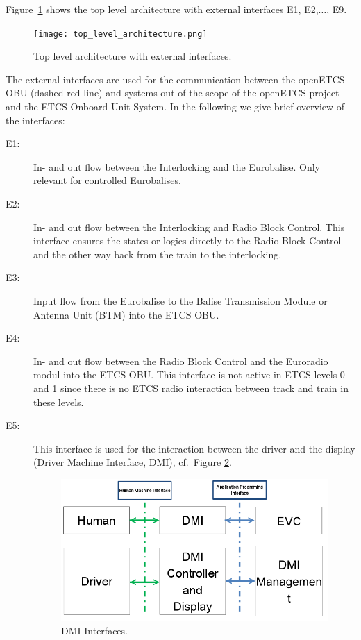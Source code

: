 Figure~\ref{f:top_level} shows the top level architecture with external interfaces E1, E2,$\ldots$, E9.
\begin{figure}
\centering
\texttt{[image: top\_level\_architecture.png]}
\caption{Top level architecture with external interfaces.}
\label{f:top_level}
\end{figure}
The external interfaces are used for the communication between the openETCS OBU (dashed red line) and systems out of the scope of the openETCS project and the ETCS Onboard Unit System. In the following we give  brief overview of the interfaces:
\begin{description}
\item[E1:] In- and out flow between the Interlocking and the Eurobalise. Only relevant for controlled Eurobalises.

\item[E2:] In- and out flow between the Interlocking and Radio Block Control.
This interface ensures the states or logics directly to the Radio Block Control and the other way back from the train to the interlocking.

\item[E3:] Input flow from the Eurobalise to the Balise Transmission Module or Antenna Unit (BTM) into the ETCS OBU.

\item[E4:] In- and out flow between the Radio Block Control and the Euroradio modul into the ETCS OBU. This interface is not active in ETCS levels 0 and 1 since there is no ETCS radio interaction between track and train in these levels.

\item[E5:] This interface is used for the interaction between the driver and the display (Driver Machine Interface, DMI), cf.~Figure \ref{DMI Interfaces}.
\begin{figure}
\centering
\includegraphics[scale=0.5]{images/DMIinterfaces}
\caption{DMI Interfaces.}
\label{DMI Interfaces}
\end{figure}


\end{description}
